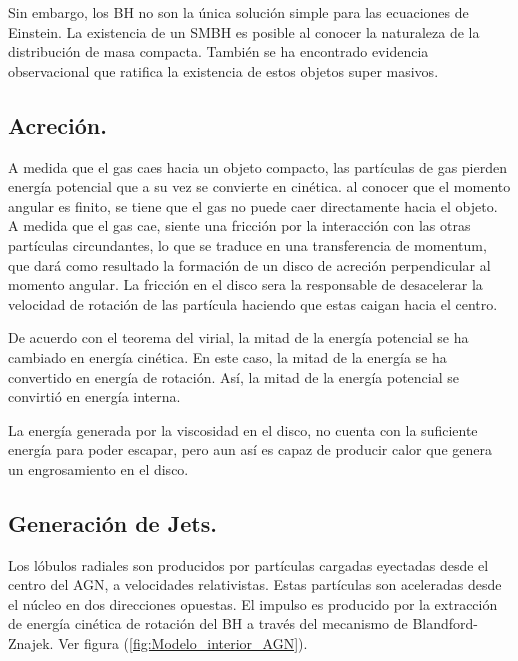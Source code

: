Sin embargo, los BH no son la única solución simple para las ecuaciones de Einstein. La existencia de un SMBH es posible al conocer la naturaleza de la distribución de masa compacta. También se ha encontrado evidencia observacional que ratifica la existencia de estos objetos super masivos. 

	\subsection{Acreción.}
	\label{subsec:Acretion}

A medida que el gas caes hacia un objeto compacto, las partículas de gas pierden energía potencial que a su vez se convierte en cinética. al conocer que el momento angular es finito, se tiene que el gas no puede caer directamente hacia el objeto. A medida que el gas cae, siente una fricción por la interacción con las otras partículas circundantes, lo que se traduce en una transferencia de momentum, que dará como resultado la formación de un disco de acreción perpendicular al momento angular. La fricción en el disco sera la responsable de desacelerar la velocidad de rotación de las partícula haciendo que estas caigan hacia el centro. 

De acuerdo con el teorema del virial, la mitad de la energía potencial se ha cambiado en energía cinética. En este caso, la mitad de la energía se ha convertido en energía de rotación. Así, la mitad de la energía potencial se convirtió en energía interna. 

La energía generada por la viscosidad en el disco, no cuenta con la suficiente energía para poder escapar, pero aun así es capaz de producir calor que genera un engrosamiento en el disco.


	\subsection{Generación de Jets.}
	\label{subsec:Generation_Jets}

Los lóbulos radiales son producidos por partículas cargadas eyectadas desde el centro del AGN, a velocidades relativistas. Estas partículas son aceleradas desde el núcleo en dos direcciones opuestas. El impulso es producido por la extracción de energía cinética de rotación del BH a través del mecanismo de Blandford- Znajek. Ver figura (\ref{fig:Modelo_interior_AGN}).%

